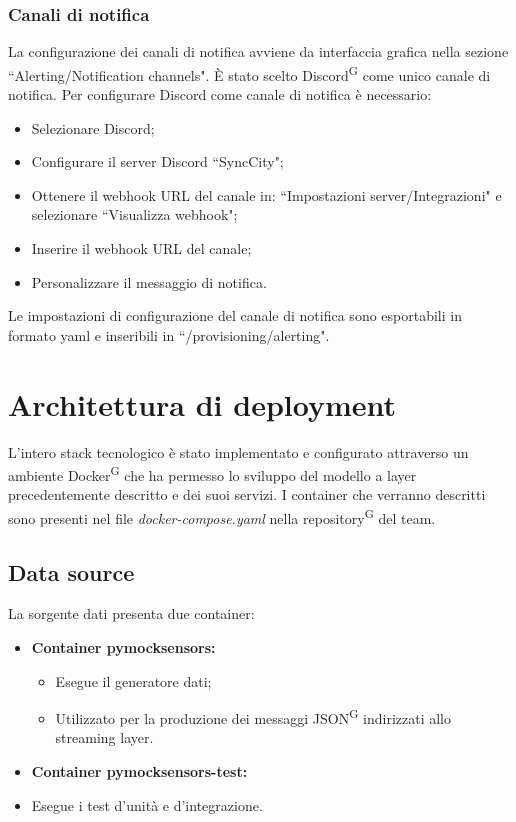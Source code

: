 \documentclass[8pt]{article}
\newcommand{\glossterm}[1]{#1\textsuperscript{G}} %
\begin{document}
\subsubsection{Canali di notifica}
La configurazione dei canali di notifica avviene da interfaccia grafica nella sezione ``Alerting/Notification channels".
È stato scelto \glossterm{Discord} come unico canale di notifica.
Per configurare Discord come canale di notifica è necessario:
\begin{itemize}
    \item Selezionare Discord;
    \item Configurare il server Discord ``SyncCity";
    \item Ottenere il webhook URL del canale in: ``Impostazioni server/Integrazioni" e selezionare ``Visualizza webhook";
    \item Inserire il webhook URL del canale;
    \item Personalizzare il messaggio di notifica.
\end{itemize}
Le impostazioni di configurazione del canale di notifica sono esportabili in formato yaml e inseribili in ``/provisioning/alerting".
\newpage
\section{Architettura di deployment}\label{sec:dep}
L’intero stack tecnologico è stato implementato e configurato attraverso un ambiente \glossterm{Docker} che ha permesso lo sviluppo del modello a layer precedentemente descritto e dei suoi servizi. I container che verranno descritti sono presenti nel file \textit{docker-compose.yaml} nella \glossterm{repository} del team.
\subsection{Data source}
La sorgente dati presenta due container:
\begin{itemize}
    \item \textbf{Container pymocksensors:}
    \begin{itemize}
        \item Esegue il generatore dati;
        \item Utilizzato per la produzione dei messaggi \glossterm{JSON} indirizzati allo streaming layer.
    \end{itemize}
    \item \textbf{Container pymocksensors-test:}
        \item Esegue i test d'unità e d'integrazione.
\end{itemize}
\end{document}
